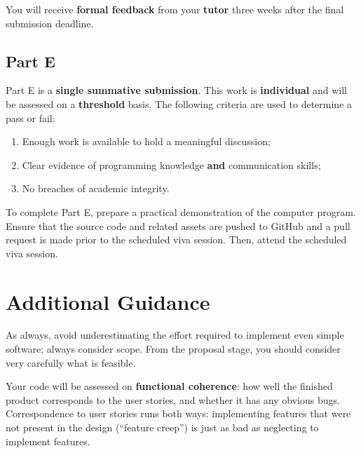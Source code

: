 \documentclass{../../fal_assignment}
\begin{document}
You will receive \textbf{formal feedback} from your \textbf{tutor} three weeks after the final submission deadline.

\subsection*{Part E}

Part E is a \textbf{single summative submission}. This work is \textbf{individual} and will be assessed on a \textbf{threshold} basis.  The following criteria are used to determine a pass or fail:

\begin{enumerate}[label=(\alph*)]
	\item Enough work is available to hold a meaningful discussion;
	\item Clear evidence of programming knowledge \textbf{and} communication skills;
	\item No breaches of academic integrity.
\end{enumerate}

To complete Part E, prepare a practical demonstration of the computer program. Ensure that the source code and related assets are pushed to GitHub and a pull request is made prior to the scheduled viva session. Then, attend the scheduled viva session.

\section*{Additional Guidance}

As always, avoid underestimating the effort required to implement even simple software; always consider scope.
From the proposal stage, you should consider very carefully what is feasible.

Your code will be assessed on \textbf{functional coherence}:
how well the finished product corresponds to the user stories,
and whether it has any obvious bugs.
Correspondence to user stories runs both ways:
implementing features that were not present in the design (``feature creep'')
is just as bad as neglecting to implement features.

\end{document}
